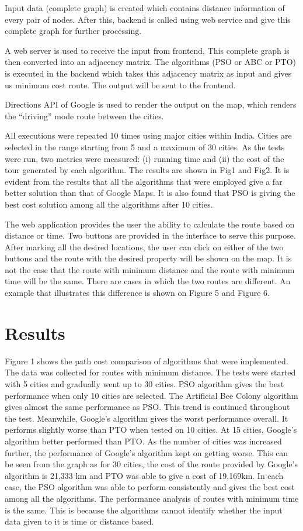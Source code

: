 \documentclass[conference]{IEEEtran}
\begin{document}
Input data (complete graph) is created which contains distance information of every pair of nodes. After this, backend is called using web service and give this complete graph for further processing.

A web server is used to receive the input from frontend, This complete graph is then converted into an adjacency matrix. The algorithms (PSO or ABC or PTO) is executed in the backend which takes this adjacency matrix as input and gives us minimum cost route. The output will be sent to the frontend.

Directions API of Google is used to render the output on the map, which renders the “driving” mode route between the cities.

All executions were repeated 10 times using major cities within India. Cities are selected in the range starting from 5 and a maximum of 30 cities. As the tests were run, two metrics were measured: (i) running time and (ii) the cost of the tour generated by each algorithm. The results are shown in Fig1 and Fig2. It is evident from the results that all the algorithms that were employed give a far better solution than that of Google Maps. It is also found that PSO is giving the best cost solution among all the algorithms after 10 cities.

The web application provides the user the ability to calculate the route based on distance or time. Two buttons are provided in the interface to serve this purpose. After marking all the desired locations, the user can click on either of the two buttons and the route with the desired property will be shown on the map. It is not the case that the route with minimum distance and the route with minimum time will be the same. There are cases in which the two routes are different. An example that illustrates this difference is shown on Figure 5 and Figure 6.

\section {Results}

Figure 1 shows the path cost comparison of algorithms that were implemented. The data was collected for routes with minimum distance. The tests were started with 5 cities and gradually went up to 30 cities. PSO algorithm gives the best performance when only 10 cities are selected. The Artificial Bee Colony algorithm gives almost the same performance as PSO.  This trend is continued throughout the test. Meanwhile, Google’s algorithm gives the worst performance overall. It performs slightly worse than PTO when tested on 10 cities. At 15 cities, Google’s algorithm better performed than PTO. As the number of cities was increased further, the performance of Google’s algorithm kept on getting worse. This can be seen from the graph as for 30 cities, the cost of the route provided by Google’s algorithm is 21,333 km and PTO was able to give a cost of 19,169km. In each case, the PSO algorithm was able to perform consistently and gives the best cost among all the algorithms. The performance analysis of routes with minimum time is the same. This is because the algorithms cannot identify whether the input data given to it is time or distance based.
\end{document}
